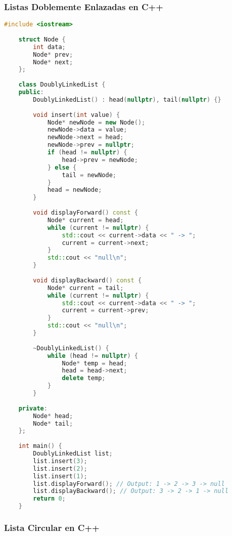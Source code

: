     \subsubsection{Listas Doblemente Enlazadas en C++}
    
    \begin{lstlisting}[language=C++]
    #include <iostream>
    
    struct Node {
        int data;
        Node* prev;
        Node* next;
    };
    
    class DoublyLinkedList {
    public:
        DoublyLinkedList() : head(nullptr), tail(nullptr) {}
        
        void insert(int value) {
            Node* newNode = new Node();
            newNode->data = value;
            newNode->next = head;
            newNode->prev = nullptr;
            if (head != nullptr) {
                head->prev = newNode;
            } else {
                tail = newNode;
            }
            head = newNode;
        }
        
        void displayForward() const {
            Node* current = head;
            while (current != nullptr) {
                std::cout << current->data << " -> ";
                current = current->next;
            }
            std::cout << "null\n";
        }
        
        void displayBackward() const {
            Node* current = tail;
            while (current != nullptr) {
                std::cout << current->data << " -> ";
                current = current->prev;
            }
            std::cout << "null\n";
        }
    
        ~DoublyLinkedList() {
            while (head != nullptr) {
                Node* temp = head;
                head = head->next;
                delete temp;
            }
        }
    
    private:
        Node* head;
        Node* tail;
    };
    
    int main() {
        DoublyLinkedList list;
        list.insert(3);
        list.insert(2);
        list.insert(1);
        list.displayForward(); // Output: 1 -> 2 -> 3 -> null
        list.displayBackward(); // Output: 3 -> 2 -> 1 -> null
        return 0;
    }
    \end{lstlisting}
    
    \subsubsection{Lista Circular en C++}
    

